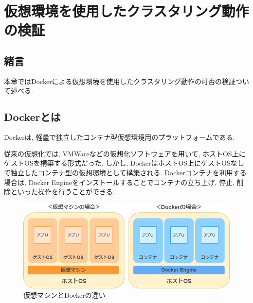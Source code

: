 \chapter{仮想環境を使用したクラスタリング動作の検証}
\label{chap:fourth}

\section{緒言}
本章ではDockerによる仮想環境を使用したクラスタリング動作の可否の検証ついて述べる.





\section{Dockerとは}
Dockerは, 軽量で独立したコンテナ型仮想環境用のプラットフォームである.

従来の仮想化では, VMWareなどの仮想化ソフトウェアを用いて, ホストOS上にゲストOSを構築する形式だった.
しかし, DockerはホストOS上にゲストOSなしで独立したコンテナ型の仮想環境として構築される.
Dockerコンテナを利用する場合は, Docker Engineをインストールすることでコンテナの立ち上げ, 停止, 削除といった操作を行うことができる.

\begin{figure}[H]
  \begin{center}
    \includegraphics[width=120mm]{sotu/figure/docker-vmware.png}
    \caption{仮想マシンとDockerの違い \cite{3}}
    \label{4-p1}
  \end{center}
\end{figure}

